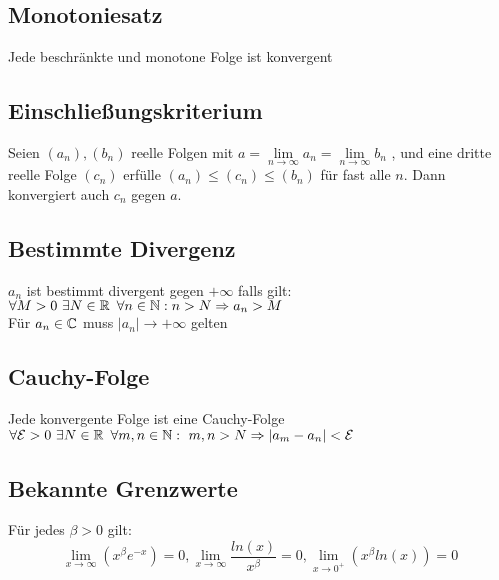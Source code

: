 \documentclass[german]{latex4ei/latex4ei_sheet}
\begin{document}
\begin{sectionbox}
	\subsection{Monotoniesatz}
	
	Jede beschränkte und monotone Folge ist konvergent

\end{sectionbox}



\begin{sectionbox}
	\subsection{Einschließungskriterium}
	
Seien $(a_n), (b_n)$  reelle Folgen mit $a = \lim\limits_{n \to \infty}  a_n =  \lim\limits_{n \to \infty}b_n $ , und eine dritte reelle Folge $(c_n)$ erfülle  $(a_n) \le (c_n) \le (b_n)$ für fast alle $n$. Dann konvergiert auch \(c_n\)  gegen $a$.
	
	
\end{sectionbox}

\begin{sectionbox}
	\subsection{Bestimmte Divergenz}
	
	\(a_n\) ist bestimmt divergent gegen $+\infty$ falls gilt: \\
	$\forall M >0 \text{ }\exists N \in \operatorname{\mathbb R} \text{ }\forall n \in \operatorname{\mathbb N}: n>N \Rightarrow a_n>M$ \\
Für $a_n \in \mathbb C $ muss $|a_n| \rightarrow +\infty $ gelten
\end{sectionbox}


\begin{sectionbox}
	\subsection{Cauchy-Folge}
	Jede konvergente Folge ist eine Cauchy-Folge \\
	$	\forall\mathcal{E}>0 \text{ }\exists N \in \operatorname{\mathbb R} \text{ }\forall m,n \in \operatorname{\mathbb N}:\text{ } m,n>N \Rightarrow |a_m - a_n|<\mathcal{E}$

\end{sectionbox}

\begin{sectionbox}
	\subsection{Bekannte Grenzwerte}
	Für jedes $\beta > 0$ gilt:
	\begin{equation*}
		\lim \limits_{x \to \infty}(x^\beta e^{-x})= 0, \lim \limits_{x \to \infty} \frac{ln(x)}{x^\beta} = 0, \lim \limits_{x \to 0^+}(x^\beta ln(x))= 0
	\end{equation*}

\end{sectionbox}
\end{document}
